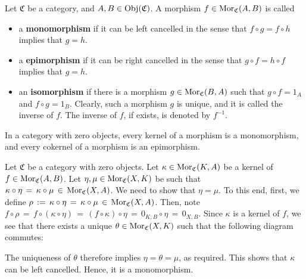 
\vskip 0.5cm
\begin{definition}
\mbox{}
\vskip 0.1cm
\noindent
Let $\mathfrak{C}$ be a category, and $A, B \in \textnormal{Obj}(\mathfrak{C})$.
A morphism $f \in \textnormal{Mor}_{\mathfrak{C}}(A,B)$ is called
\begin{itemize}
\item
	a \textbf{monomorphism} if it can be {\color{red}left} cancelled in the sense that
	$f \circ g = f \circ h$  implies that $g = h$.
\item
	a \textbf{epimorphism} if it can be {\color{red}right} cancelled in the sense that
	$g \circ f = h \circ f$  implies that $g = h$.
\item
	an \textbf{isomorphism} if there is a morphism $g \in \textnormal{Mor}_{\mathfrak{C}}(B,A)$
	such that $g \circ f = 1_{A}$ and $f \circ g = 1_{B}$.
	Clearly, such a morphism $g$ is unique, and it is called the inverse of $f$.
	The inverse of $f$, if exists, is denoted by $f^{-1}$.
\end{itemize}
\end{definition}


\vskip 0.5cm
\begin{proposition}
\mbox{}
\vskip 0.1cm
\noindent
In a category with zero objects, every kernel of a morphism is a monomorphism, and
every cokernel of a morphism is an epimorphism.
\end{proposition}
\proof
Let $\mathfrak{C}$ be a category with zero objects.
Let $\kappa \in \textnormal{Mor}_{\mathfrak{C}}(K,A)$ be a kernel of $f \in \textnormal{Mor}_{\mathfrak{C}}(A,B)$.
Let $\eta, \mu \in \textnormal{Mor}_{\mathfrak{C}}(X,K)$ be such that
$\kappa \circ \eta \,=\, \kappa \circ \mu \,\in\, \textnormal{Mor}_{\mathfrak{C}}(X,A)$.
We need to show that $\eta = \mu$.
To this end, first, we define $\rho \,:=\, \kappa \circ \eta \,=\, \kappa \circ \mu \,\in\, \textnormal{Mor}_{\mathfrak{C}}(X,A)$.
Then, note
$f \circ \rho \,=\, f \circ (\kappa \circ \eta) \,=\, (f \circ \kappa) \circ \eta \,=\, 0_{K,B} \circ \eta \,=\, 0_{X,B}$.
Since $\kappa$ is a kernel of $f$, we see that there exists a unique $\theta \in \textnormal{Mor}_{\mathfrak{C}}(X,K)$ such that
the following diagram commutes:
\begin{center}
\end{center}
The uniqueness of $\theta$ therefore implies $\eta = \theta = \mu$, as required.
This shows that $\kappa$ can be left cancelled.
Hence, it is a monomorphism.

